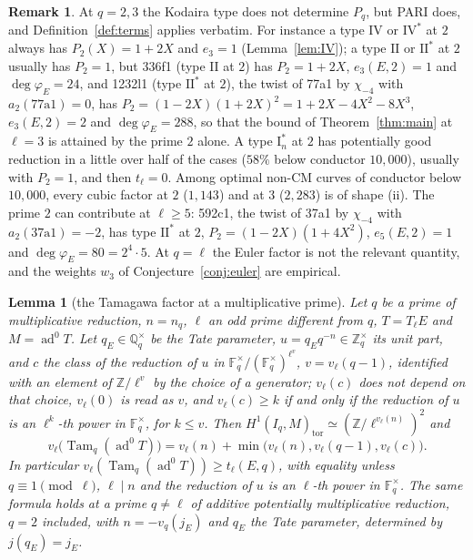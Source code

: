 \documentclass[11pt]{amsart}
\newtheorem{lemma}[theorem]{Lemma}
\theoremstyle{definition}
\newtheorem{remark}[theorem]{Remark}
\newcommand{\Q}{\mathbb{Q}}
\newcommand{\Z}{\mathbb{Z}}
\newcommand{\F}{\mathbb{F}}
\newcommand{\degphi}{\deg\varphi_E}
\newcommand{\ad}{\operatorname{ad}^0}
\newcommand{\Tam}{\operatorname{Tam}}
\begin{document}
\begin{remark}\label{rem:wild}
At $q=2,3$ the Kodaira type does not determine $P_q$, but PARI does, and Definition~\ref{def:terms} applies verbatim. For instance a type $\mathrm{IV}$ or $\mathrm{IV}^*$ at $2$ always has $P_2(X)=1+2X$ and $e_3=1$ (Lemma~\ref{lem:IV}); a type $\mathrm{II}$ or $\mathrm{II}^*$ at $2$ usually has $P_2=1$, but 336f1 (type $\mathrm{II}$ at $2$) has $P_2=1+2X$, $e_3(E,2)=1$ and $\degphi=24$, and 1232l1 (type $\mathrm{II}^*$ at $2$), the twist of 77a1 by $\chi_{-4}$ with $a_2(\text{77a1})=0$, has $P_2=(1-2X)(1+2X)^2=1+2X-4X^2-8X^3$, $e_3(E,2)=2$ and $\degphi=288$, so that the bound of Theorem~\ref{thm:main} at $\ell=3$ is attained by the prime $2$ alone. A type $\mathrm{I}_n^*$ at $2$ has potentially good reduction in a little over half of the cases ($58\%$ below conductor $10{,}000$), usually with $P_2=1$, and then $t_\ell=0$. Among optimal non-CM curves of conductor below $10{,}000$, every cubic factor at $2$ ($1{,}143$) and at $3$ ($2{,}283$) is of shape (ii). The prime $2$ can contribute at $\ell\ge5$: 592c1, the twist of 37a1 by $\chi_{-4}$ with $a_2(\text{37a1})=-2$, has type $\mathrm{II}^*$ at $2$, $P_2=(1-2X)(1+4X^2)$, $e_5(E,2)=1$ and $\degphi=80=2^4\cdot5$. At $q=\ell$ the Euler factor is not the relevant quantity, and the weights $w_3$ of Conjecture~\ref{conj:euler} are empirical.
\end{remark}

\begin{lemma}[the Tamagawa factor at a multiplicative prime]\label{lem:tamfactor}
Let $q$ be a prime of multiplicative reduction, $n=n_q$, $\ell$ an odd prime different from $q$, $T=T_\ell E$ and $M=\ad T$. Let $q_E\in\Q_q^\times$ be the Tate parameter, $u=q_Eq^{-n}\in\Z_q^\times$ its unit part, and $c$ the class of the reduction of $u$ in $\F_q^\times/(\F_q^\times)^{\ell^{v}}$, $v=v_\ell(q-1)$, identified with an element of $\Z/\ell^{v}$ by the choice of a generator; $v_\ell(c)$ does not depend on that choice, $v_\ell(0)$ is read as $v$, and $v_\ell(c)\ge k$ if and only if the reduction of $u$ is an $\ell^k$-th power in $\F_q^\times$, for $k\le v$. Then $H^1(I_q,M)_{\mathrm{tor}}\simeq(\Z/\ell^{v_\ell(n)})^2$ and
\[
v_\ell\bigl(\Tam_q(\ad T)\bigr)=v_\ell(n)+\min\bigl(v_\ell(n),v_\ell(q-1),v_\ell(c)\bigr).
\]
In particular $v_\ell(\Tam_q(\ad T))\ge t_\ell(E,q)$, with equality unless $q\equiv1\pmod\ell$, $\ell\mid n$ and the reduction of $u$ is an $\ell$-th power in $\F_q^\times$. The same formula holds at a prime $q\ne\ell$ of additive potentially multiplicative reduction, $q=2$ included, with $n=-v_q(j_E)$ and $q_E$ the Tate parameter, determined by $j(q_E)=j_E$.
\end{lemma}
\end{document}

